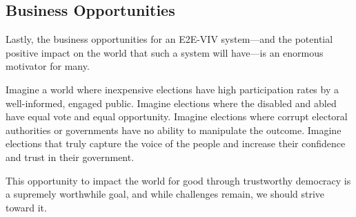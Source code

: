 \subsection{Business Opportunities}

Lastly, the business opportunities for an E2E-VIV system---and the
potential positive impact on the world that such a system will
have---is an enormous motivator for many. 

Imagine a world where inexpensive elections have high participation
rates by a well-informed, engaged public. Imagine elections where the
disabled and abled have equal vote and equal opportunity. Imagine
elections where corrupt electoral authorities or governments have no
ability to manipulate the outcome. Imagine elections that truly
capture the voice of the people and increase their confidence and
trust in their government. 

This opportunity to impact the world for good through trustworthy
democracy is a supremely worthwhile goal, and while challenges remain,
we should strive toward it.


